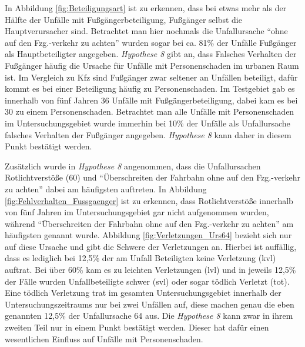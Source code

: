 In Abbildung \ref{fig:Beteiligungsart} ist zu erkennen, dass bei etwas mehr als der Hälfte der Unfälle mit Fußgängerbeteiligung, Fußgänger selbst die Hauptverursacher sind. Betrachtet man hier nochmals die Unfallursache \enquote{ohne auf den Fzg.-verkehr zu achten} wurden sogar bei ca. 81\% der Unfälle Fußgänger als Hauptbeteiligter angegeben. \textit{Hypothese 8} gibt an, dass Falsches Verhalten der Fußgänger häufig die Ursache für Unfälle mit Personenschaden im urbanen Raum ist. Im Vergleich zu Kfz sind Fußgänger zwar seltener an Unfällen beteiligt, dafür kommt es bei einer Beteiligung häufig zu Personenschaden. Im Testgebiet gab es innerhalb von fünf Jahren 36 Unfälle mit Fußgängerbeteiligung, dabei kam es bei 30 zu einem Personenschaden. Betrachtet man alle Unfälle mit Personenschaden im Untersuchungsgebiet wurde immerhin bei 10\% der Unfälle als Unfallursache falsches Verhalten der Fußgänger angegeben. \textit{Hypothese 8} kann daher in diesem Punkt bestätigt werden.

Zusätzlich wurde in \textit{Hypothese 8} angenommen, dass die Unfallursachen Rotlichtverstöße (60) und \enquote{Überschreiten der Fahrbahn ohne auf den Fzg.-verkehr zu achten} dabei am häufigsten auftreten. In Abbildung \ref{fig:Fehlverhalten_Fussgaenger} ist zu erkennen, dass Rotlichtverstöße innerhalb von fünf Jahren im Untersuchungsgebiet gar nicht aufgenommen wurden, während \enquote{Überschreiten der Fahrbahn ohne auf den Fzg.-verkehr zu achten} am häufigsten genannt wurde. Abbildung \ref{fig:Verletzungen_Urs64} bezieht sich nur auf diese Ursache und gibt die Schwere der Verletzungen an. Hierbei ist auffällig, dass es lediglich bei 12,5\% der am Unfall Beteiligten keine Verletzung (kvl) auftrat. Bei über 60\% kam es zu leichten Verletzungen (lvl) und in jeweils 12,5\% der Fälle wurden Unfallbeteiligte schwer (svl) oder sogar tödlich Verletzt (tot). Eine tödlich Verletzung trat im gesamten Untersuchungsgebiet innerhalb der Untersuchungszeitraums nur bei zwei Unfällen auf, diese machen genau die eben genannten 12,5\% der Unfallursache 64 aus. Die \textit{Hypothese 8} kann zwar in ihrem zweiten Teil nur in einem Punkt bestätigt werden. Dieser hat dafür einen wesentlichen Einfluss auf Unfälle mit Personenschaden.

